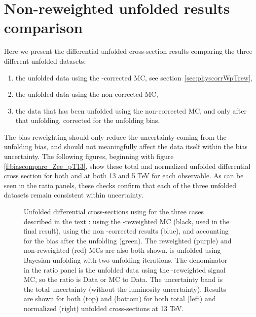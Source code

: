 \section{\ptz Non-reweighted unfolded results comparison }
\label{sec:zpt_nonrew_unf}

Here we present the differential unfolded cross-section results comparing the three different unfolded datasets:
\begin{enumerate}
  \item the unfolded data using the \pt-corrected MC, see section~\ref{sec:physcorrWpTrew},
  \item the unfolded data using the non-corrected MC,
  \item the data that has been unfolded using the non-corrected MC, and only after that unfolding, corrected for the unfolding bias.
\end{enumerate}

 The bias-reweighting should only reduce the uncertainty coming from the unfolding bias, and should not meaningfully affect the data itself within the bias uncertainty. The following figures, beginning with figure \ref{f:biascompare_Zee_pT13}, show these total and normalized unfolded differential cross section for both \Zee and \Zmm at both 13 and 5 TeV for each observable. As can be seen in the ratio panels, these checks confirm that each of the three unfolded datasets remain consistent within uncertainty.

\begin{figure}[h]
\centering
{}

\caption{Unfolded differential cross-sections using \ptdilep for the three cases described in the text : using the \pt-reweighted MC (black, used in the final result), using the non \pt-corrected results (blue), and accounting for the bias after the unfolding (green). The reweighted (purple) and non-reweighted (red) MCs are also both shown. \ptdilep is unfolded using Bayesian unfolding with two unfolding iterations. The denominator in the ratio panel is the unfolded data using the \pt-reweighted signal MC, so the ratio is Data or MC to Data. The uncertainty band is the total uncertainty (without the luminosity uncertainty). Results are shown for both \Zee (top) and \Zmm (bottom) for both total (left) and normalized (right) unfolded cross-sections at 13 TeV.}\end{figure}

